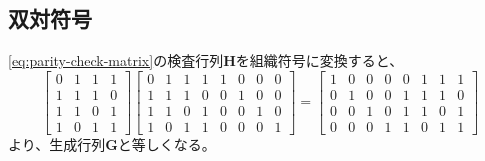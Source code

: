 \documentclass[a4paper,11pt]{jsarticle}
\begin{document}
\subsection{双対符号}
\eqref{eq:parity-check-matrix}の検査行列${\bm H}$を組織符号に変換すると、
\begin{equation*}
  \begin{bmatrix}
    0 & 1 & 1 & 1 \\
    1 & 1 & 1 & 0 \\
    1 & 1 & 0 & 1 \\
    1 & 0 & 1 & 1
  \end{bmatrix}
  \begin{bmatrix}
    0 & 1 & 1 & 1 & 1 & 0 & 0 & 0 \\
    1 & 1 & 1 & 0 & 0 & 1 & 0 & 0 \\
    1 & 1 & 0 & 1 & 0 & 0 & 1 & 0 \\
    1 & 0 & 1 & 1 & 0 & 0 & 0 & 1
  \end{bmatrix}=
  \begin{bmatrix}
    1 & 0 & 0 & 0 & 0 & 1 & 1 & 1 \\
    0 & 1 & 0 & 0 & 1 & 1 & 1 & 0 \\
    0 & 0 & 1 & 0 & 1 & 1 & 0 & 1 \\
    0 & 0 & 0 & 1 & 1 & 0 & 1 & 1
  \end{bmatrix}
\end{equation*}
より、生成行列${\bm G}$と等しくなる。
\end{document}
